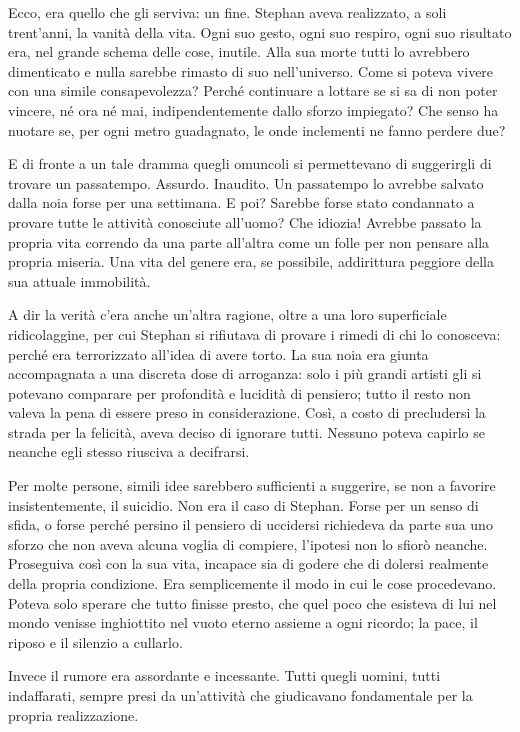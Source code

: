 \documentclass[a4paper,12pt,oneside]{memoir}
\begin{document}
Ecco, era quello che gli serviva: un fine. Stephan aveva realizzato, a soli
trent'anni, la vanità della vita. Ogni suo gesto, ogni suo respiro, ogni suo
risultato era, nel grande schema delle cose, inutile. Alla sua morte tutti lo
avrebbero dimenticato e nulla sarebbe rimasto di suo nell'universo. Come si
poteva vivere con una simile consapevolezza? Perché continuare a lottare se si
sa di non poter vincere, né ora né mai, indipendentemente dallo sforzo
impiegato? Che senso ha nuotare se, per ogni metro guadagnato, le onde
inclementi ne fanno perdere due?

E di fronte a un tale dramma quegli omuncoli si permettevano di suggerirgli di
trovare un passatempo. Assurdo. Inaudito. Un passatempo lo avrebbe salvato dalla
noia forse per una settimana. E poi? Sarebbe forse stato condannato a provare
tutte le attività conosciute all'uomo? Che idiozia! Avrebbe passato la propria
vita correndo da una parte all'altra come un folle per non pensare alla propria
miseria. Una vita del genere era, se possibile, addirittura peggiore della sua
attuale immobilità.

A dir la verità c'era anche un'altra ragione, oltre a una loro superficiale
ridicolaggine, per cui Stephan si rifiutava di provare i rimedi di chi lo
conosceva: perché era terrorizzato all'idea di avere torto. La sua noia era
giunta accompagnata a una discreta dose di arroganza: solo i più grandi artisti
gli si potevano comparare per profondità e lucidità di pensiero; tutto il resto
non valeva la pena di essere preso in considerazione. Così, a costo di
precludersi la strada per la felicità, aveva deciso di ignorare tutti. Nessuno
poteva capirlo se neanche egli stesso riusciva a decifrarsi.

Per molte persone, simili idee sarebbero sufficienti a suggerire, se non a
favorire insistentemente, il suicidio. Non era il caso di Stephan. Forse per un
senso di sfida, o forse perché persino il pensiero di uccidersi richiedeva da
parte sua uno sforzo che non aveva alcuna voglia di compiere, l'ipotesi non lo
sfiorò neanche. Proseguiva così con la sua vita, incapace sia di godere che di
dolersi realmente della propria condizione. Era semplicemente il modo in cui le
cose procedevano. Poteva solo sperare che tutto finisse presto, che quel poco
che esisteva di lui nel mondo venisse inghiottito nel vuoto eterno assieme a
ogni ricordo; la pace, il riposo e il silenzio a cullarlo.

Invece il rumore era assordante e incessante. Tutti quegli uomini, tutti
indaffarati, sempre presi da un'attività che giudicavano fondamentale per la
propria realizzazione.



\end{document}

